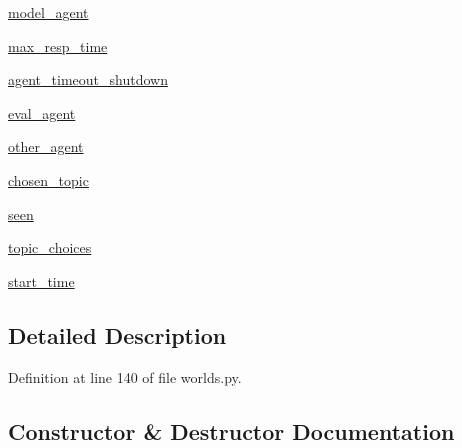 \begin{DoxyCompactItemize}
\item 
\hyperlink{classprojects_1_1wizard__of__wikipedia_1_1mturk__evaluation__task_1_1worlds_1_1WizardEval_a55e5a388195e3eb5455bc3fdd004b5e0}{model\+\_\+agent}
\item 
\hyperlink{classprojects_1_1wizard__of__wikipedia_1_1mturk__evaluation__task_1_1worlds_1_1WizardEval_acf3ad9fdd1d432a9a520ea8bce150f4f}{max\+\_\+resp\+\_\+time}
\item 
\hyperlink{classprojects_1_1wizard__of__wikipedia_1_1mturk__evaluation__task_1_1worlds_1_1WizardEval_aef19629b948f594f5db8b97a0a482c00}{agent\+\_\+timeout\+\_\+shutdown}
\item 
\hyperlink{classprojects_1_1wizard__of__wikipedia_1_1mturk__evaluation__task_1_1worlds_1_1WizardEval_a07a6ad3dcadff66b04e4e9eb652f4910}{eval\+\_\+agent}
\item 
\hyperlink{classprojects_1_1wizard__of__wikipedia_1_1mturk__evaluation__task_1_1worlds_1_1WizardEval_a18f6c2c8871d9f39ba0c7a205b05aa8e}{other\+\_\+agent}
\item 
\hyperlink{classprojects_1_1wizard__of__wikipedia_1_1mturk__evaluation__task_1_1worlds_1_1WizardEval_a72f089d7257435bf9e1cb20ba293d4ad}{chosen\+\_\+topic}
\item 
\hyperlink{classprojects_1_1wizard__of__wikipedia_1_1mturk__evaluation__task_1_1worlds_1_1WizardEval_a6295bb9c04061cacd467fbcb9c3ff6b6}{seen}
\item 
\hyperlink{classprojects_1_1wizard__of__wikipedia_1_1mturk__evaluation__task_1_1worlds_1_1WizardEval_a3777176fe6a2ef5586e2dbbe2b4e9894}{topic\+\_\+choices}
\item 
\hyperlink{classprojects_1_1wizard__of__wikipedia_1_1mturk__evaluation__task_1_1worlds_1_1WizardEval_a46e08a2e5573f3748e8fba9e8122931c}{start\+\_\+time}
\end{DoxyCompactItemize}


\subsection{Detailed Description}


Definition at line 140 of file worlds.\+py.



\subsection{Constructor \& Destructor Documentation}
\mbox{\label{classprojects_1_1wizard__of__wikipedia_1_1mturk__evaluation__task_1_1worlds_1_1WizardEval_aca423a5d725be8a770f2f9c880f84122}} 
